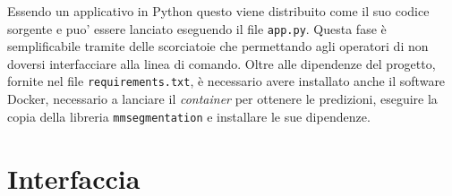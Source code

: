 Essendo un applicativo in Python questo viene distribuito
come il suo codice sorgente e puo' essere lanciato eseguendo
il file {\tt app.py}.
Questa fase è semplificabile tramite delle scorciatoie che
permettando agli operatori di non doversi interfacciare alla
linea di comando.
Oltre alle dipendenze del progetto, fornite nel file
{\tt requirements.txt}, è necessario avere installato anche
il software Docker, necessario a lanciare il {\it container}
per ottenere le predizioni, eseguire la copia della
libreria {\tt mmsegmentation} e installare le sue dipendenze.


\section{Interfaccia}




